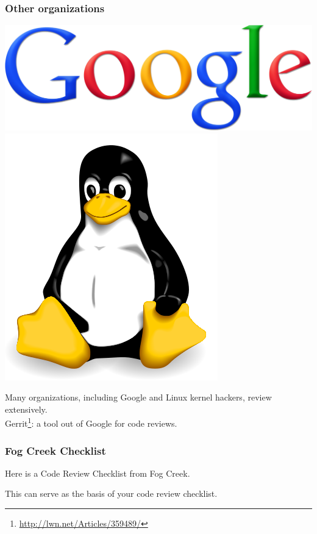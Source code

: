 \begin{frame}
\frametitle{Other organizations}

\begin{center}
\includegraphics[width=.4\textwidth]{images/Googlelogo.png} \quad
\includegraphics[width=.4\textwidth]{images/Tux.png}
\end{center}
\begin{changemargin}{1cm}
Many organizations, including Google and Linux kernel hackers,
review extensively.\\

Gerrit\footnote{\url{http://lwn.net/Articles/359489/}}: a tool out of
Google for code reviews.

\end{changemargin}

\end{frame}

\begin{frame}
\frametitle{Fog Creek Checklist}
\begin{changemargin}{1cm}

Here is a Code Review Checklist from Fog Creek. 

This can serve as the basis of your code review checklist.

\end{changemargin}

\end{frame}


